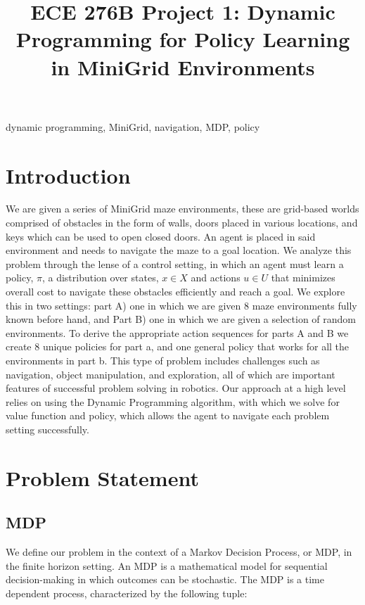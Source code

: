 \documentclass[conference]{IEEEtran}
\begin{document}
\title{ECE 276B Project 1: Dynamic Programming for Policy Learning in MiniGrid Environments}

\author{
}

\maketitle

\begin{IEEEkeywords}
dynamic programming, MiniGrid, navigation, MDP, policy
\end{IEEEkeywords}

\section{Introduction}
We are given a series of MiniGrid maze environments, these are grid-based worlds comprised of obstacles in the form of walls,
doors placed in various locations, and keys which can be used to open closed doors. An agent is placed in said environment and needs to navigate the maze
to a goal location. We analyze this problem through the lense of a control setting, in which an agent must learn a policy, $\pi$, a distribution over states, $x \in X$ and actions $u \in U$ 
that minimizes overall cost to navigate these obstacles efficiently and reach a goal.
We explore this in two settings: part A) one in which we are given 8 maze environments fully known before hand, and Part B) one in which
we are given a selection of random environments. To derive the appropriate action sequences for parts A and B
we create 8 unique policies for part a, and one general policy that works for all the environments in part b.  
This type of problem includes challenges such as navigation, object manipulation, and exploration, 
all of which are important features of successful problem solving in robotics. Our approach at a high level
relies on using the Dynamic Programming algorithm, with which we solve for value function and policy, which
allows the agent to navigate each problem setting successfully.

\section{Problem Statement}
\subsection{MDP}
We define our problem in the context of a Markov Decision Process, or MDP, in the finite horizon setting. An MDP is a mathematical
model for sequential decision-making in which outcomes can be stochastic. The MDP is a time dependent process, characterized by the following tuple:
\end{document}
